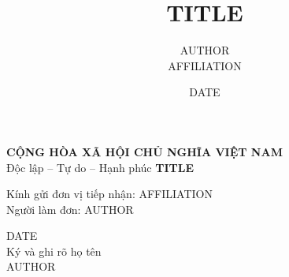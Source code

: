 \documentclass{article}
\title{{{TITLE}}}
\author{{{AUTHOR}} \\ {{AFFILIATION}}}
\date{{{DATE}}}
\begin{document}
\begin{center}\textbf{CỘNG HÒA XÃ HỘI CHỦ NGHĨA VIỆT NAM}\\ Độc lập -- Tự do -- Hạnh phúc
\vspace{1cm}
\Large\textbf{{{TITLE}}}\end{center}
Kính gửi đơn vị tiếp nhận: {{AFFILIATION}}\\
Người làm đơn: {{AUTHOR}}

\begin{flushright}{{DATE}}\\Ký và ghi rõ họ tên\\[1.5cm]{{AUTHOR}}\end{flushright}
\end{document}
